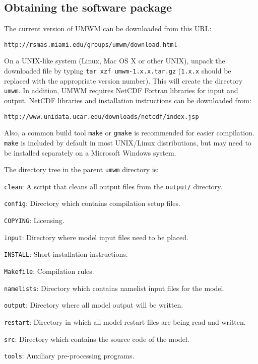 \documentclass[letterpaper]{article}
\numberwithin{equation}{section}
\begin{document}
\subsection{Obtaining the software package}

The current version of UMWM can be downloaded from this URL:

\begin{verbatim}
http://rsmas.miami.edu/groups/umwm/download.html
\end{verbatim}

On a UNIX-like system (Linux, Mac OS X or other UNIX), 
unpack the downloaded file by typing \verb+tar xzf umwm-1.x.x.tar.gz+
(\verb+1.x.x+ should be replaced with the appropriate version number).
This will create the directory \verb+umwm+.
In addition, UMWM requires NetCDF Fortran libraries for input and output.
NetCDF libraries and installation instructions can be downloaded from:

\begin{verbatim}
http://www.unidata.ucar.edu/downloads/netcdf/index.jsp
\end{verbatim}

Also, a common build tool \verb+make+ or \verb+gmake+ is recommended 
for easier compilation.
\verb+make+ is included by default in most UNIX/Linux distributions,
but may need to be installed separately on a Microsoft Windows system.

The directory tree in the parent \verb+umwm+ directory is:

\verb+clean+: A script that cleans all output files from the \verb+output/+ directory.

\verb+config+: Directory which contains compilation setup files.

\verb+COPYING+: Licensing.

\verb+input+: Directory where model input files need to be placed.

\verb+INSTALL+: Short installation instructions.

\verb+Makefile+: Compilation rules.

\verb+namelists+: Directory which contains namelist input files for the model.

\verb+output+: Directory where all model output will be written.

\verb+restart+: Directory in which all model restart files are being read and written.

\verb+src+: Directory which contains the source code of the model.

\verb+tools+: Auxiliary pre-processing programs.
\end{document}
